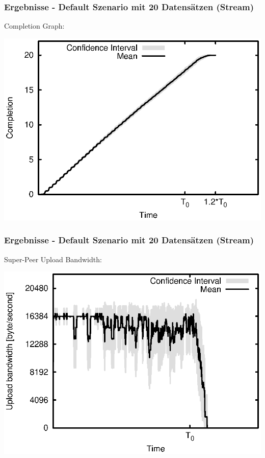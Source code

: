 \begin{frame}
  \frametitle{Ergebnisse - Default Szenario mit 20 Datensätzen (Stream)}
  Completion Graph:
  
  \begin{center}
    \includegraphics[width=1\textwidth]{fig/plots/scenario_6_parts_20/plots/GeneratedMeanChunkCompletion.csv.eps}
  \end{center}
\end{frame}


\begin{frame}
  \frametitle{Ergebnisse - Default Szenario mit 20 Datensätzen (Stream)}
  Super-Peer Upload Bandwidth:
  
  \begin{center}
    \includegraphics[width=1\textwidth]{fig/plots/scenario_6_parts_20/plots/GeneratedMeanCurrentSuperSeederUploadBandwidth.csv.eps}
  \end{center}
\end{frame}


